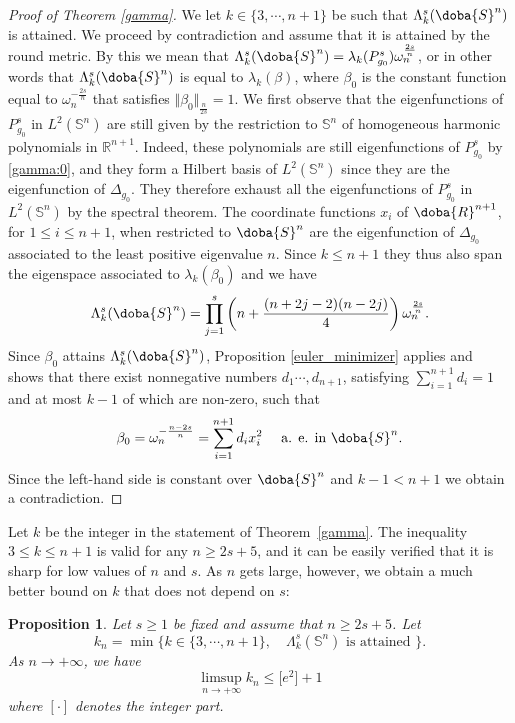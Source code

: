 \documentclass[10pt]{amsart}
\numberwithin{equation}{section}
\newcommand{\R}{\mathbb{R}}
\def\La{{\Lambda}}
\def\om{{\omega}}
\def\la{{\lambda}}
\gdef\mR{\doba{R}}
\gdef\mS{\doba{S}}
\theoremstyle{plain}
\newtheorem{prop}[theo]{Proposition}%
\theoremstyle{remark}
\begin{document}
\begin{proof}[Proof of Theorem \ref{gamma}]
\medskip



We let $k \in \{3, \cdots, n+1\}$ be such that $\Lambda_k^s(\mS^n)$ is attained. We proceed by contradiction and assume that it is attained by the round metric. By this we mean that $\La_k^s(\mS^n)=  \la_k(P_{g_0}^s) \omega_n^{\frac{2s}{n}}$, or in other words that $\Lambda_k^s(\mS^n)$ is equal to $\lambda_k(\beta)$, where $\beta_0$ is the constant function equal to $\omega_n^{- \frac{2s}{n}}$ that satisfies $\Vert \beta_0 \Vert_{\frac{n}{2s}} = 1$. We first observe that the eigenfunctions of $P_{g_0}^s$ in $L^2(\mathbb{S}^n)$ are still given by the restriction to $\mathbb{S}^n$ of homogeneous harmonic polynomials in $\R^{n+1}$. Indeed, these polynomials are still eigenfunctions of $P_{g_0}^s$ by \eqref{gamma:0}, and they form a Hilbert basis of $L^2(\mathbb{S}^n)$ since they are the eigenfunction of $\Delta_{g_0}$. They therefore exhaust all the eigenfunctions of $P_{g_0}^s$ in  $L^2(\mathbb{S}^n)$ by the spectral theorem. The coordinate functions $x_i$ of $\mR^{n+1}$, for $1 \le i \le n+1$, when restricted to $\mS^n$ are the eigenfunction of $\Delta_{g_0}$ associated to the least positive eigenvalue $n$. Since $k \le n+1$ they thus also span the eigenspace associated to $\lambda_k(\beta_0)$ and we have 
$$\Lambda_k^s(\mS^n) = \prod_{j=1}^s \left( n + \frac{(n+2j-2)(n-2j)}{4} \right)  \omega_n^{\frac{2s}{n}}.$$
Since $\beta_0$ attains $\La_k^s(\mS^n)$, Proposition \ref{euler_minimizer} applies and shows that there exist nonnegative numbers $d_1  \cdots, d_{n+1} $, satisfying  $\sum_{i=1}^{n+1} d_i = 1$ and at most $k-1$ of which are non-zero, such that 
$$\beta_0 = \om_n^{-\frac{n-2s}{n}} = \sum_{i=1}^{n+1} d_i x_i^2 \quad \text{ a. e. in } \mS^n.$$
Since the left-hand side is constant over $\mS^n$ and $k-1 < n+1$ we obtain a contradiction. 
\end{proof} 


Let  $k$ be the integer in the statement of Theorem~\ref{gamma}. The inequality $3 \le k \le n+1$ is valid for any $n \ge 2s+5$, and it can be easily verified that it is sharp for low values of $n$ and $s$. As $n$ gets large, however, we obtain a much better bound on $k$ that does not depend on $s$:

\begin{prop} \label{gamma:meilleur}
Let $s \ge 1$ be fixed and assume that $n \ge 2s + 5$. Let 
$$k_n = \min \Big \{ k  \in \{3, \cdots, n+1\}, \quad \Lambda_k^s(\mathbb{S}^n) \text{ is attained } \Big \}.$$ As $n \to + \infty$, we have 
$$ \limsup_{n \to + \infty} k_n \le \big[ e^2 \big] + 1$$
where $[\cdot ]$ denotes the integer part.  
\end{prop}
\end{document}
